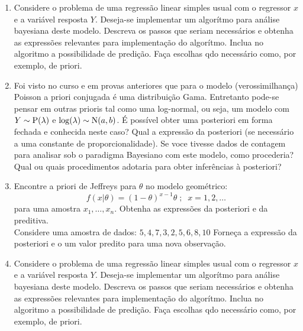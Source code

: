 \documentclass[11pt,a4]{article}\usepackage[]{graphicx}\usepackage[]{xcolor}
\begin{document}
\begin{enumerate}
\item Considere o problema de uma regressão linear simples usual com o regressor $x$ e a variável resposta $Y$.
  Deseja-se implementar um algorítmo para análise bayesiana deste modelo.
  Descreva os passos que seriam necessários e
  obtenha as expressões relevantes para implementação do algorítmo. 
  Inclua no algoritmo a possibilidade de predição.
  Faça escolhas qdo necessário como, por exemplo, de priori.
  

  
\item Foi visto no curso e em provas anteriores que para o modelo (verossimilhança) Poisson
  a priori conjugada é uma distribuição Gama.
  Entretanto pode-se pensar em outras prioris tal como uma log-normal, 
  ou seja, um modelo com $Y \sim {\rm P}(\lambda)$ e $\log(\lambda) \sim {\rm N}(a, b)$.
  É possível obter uma posteriori em forma fechada e conhecida neste caso?
  Qual a expressão da posteriori (se necessário a uma constante de proporcionalidade).
  Se voce tivesse dados de contagem para analisar sob o paradigma Bayesiano com este modelo,
  como procederia? Qual ou quais procedimentos adotaria para obter inferências à posteriori?
  
\item Encontre a priori de Jeffreys para $\theta$ no modelo geométrico:
  \[ f(x|\theta) = (1-\theta)^{x-1} \theta \; ; \;\; x=1, 2, \ldots  \]
  para uma amostra $x_1, \ldots, x_n$.
  Obtenha as expressões da posteriori e da preditiva.\\
  Considere uma amostra de dados: $5, 4, 7, 3, 2, 5, 6, 8, 10$
  Forneça a expressão da posteriori e o um valor predito para uma nova observação.

\item Considere o problema de uma regressão linear simples usual com o regressor $x$ e a variável resposta $Y$.
Deseja-se implementar um algorítmo para análise bayesiana deste modelo.
Descreva os passos que seriam necessários e
obtenha as expressões relevantes para implementação do algorítmo. 
Inclua no algoritmo a possibilidade de predição.
Faça escolhas qdo necessário como, por exemplo, de priori.



\end{enumerate}
\end{document}
